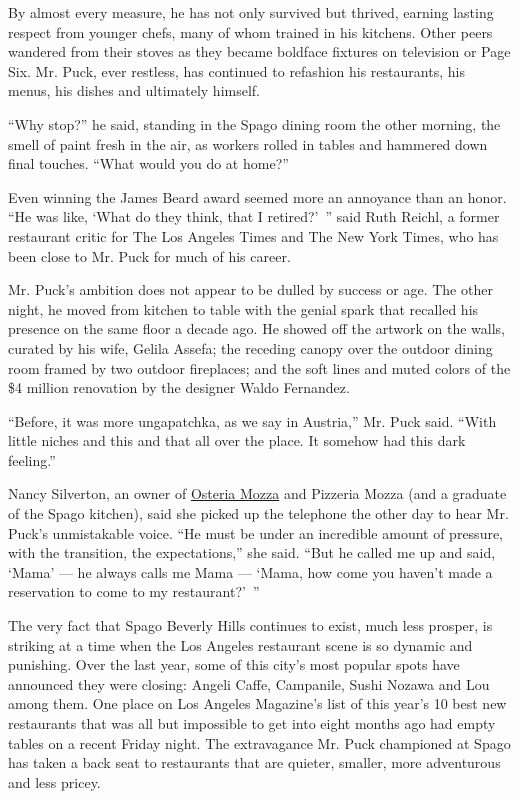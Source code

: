 By almost every measure, he has not only survived but thrived, earning
lasting respect from younger chefs, many of whom trained in his
kitchens. Other peers wandered from their stoves as they became boldface
fixtures on television or Page Six. Mr. Puck, ever restless, has
continued to refashion his restaurants, his menus, his dishes and
ultimately himself.

``Why stop?'' he said, standing in the Spago dining room the other
morning, the smell of paint fresh in the air, as workers rolled in
tables and hammered down final touches. ``What would you do at home?''

Even winning the James Beard award seemed more an annoyance than an
honor. ``He was like, `What do they think, that I retired?'~'' said Ruth
Reichl, a former restaurant critic for The Los Angeles Times and The New
York Times, who has been close to Mr. Puck for much of his career.

Mr. Puck's ambition does not appear to be dulled by success or age. The
other night, he moved from kitchen to table with the genial spark that
recalled his presence on the same floor a decade ago. He showed off the
artwork on the walls, curated by his wife, Gelila Assefa; the receding
canopy over the outdoor dining room framed by two outdoor fireplaces;
and the soft lines and muted colors of the \$4 million renovation by the
designer Waldo Fernandez.

``Before, it was more ungapatchka, as we say in Austria,'' Mr. Puck
said. ``With little niches and this and that all over the place. It
somehow had this dark feeling.''

Nancy Silverton, an owner of
\href{http://www.osteriamozza.com/LA/home.cfm}{Osteria Mozza} and
Pizzeria Mozza (and a graduate of the Spago kitchen), said she picked up
the telephone the other day to hear Mr. Puck's unmistakable voice. ``He
must be under an incredible amount of pressure, with the transition, the
expectations,'' she said. ``But he called me up and said, `Mama' --- he
always calls me Mama --- `Mama, how come you haven't made a reservation
to come to my restaurant?'~''

The very fact that Spago Beverly Hills continues to exist, much less
prosper, is striking at a time when the Los Angeles restaurant scene is
so dynamic and punishing. Over the last year, some of this city's most
popular spots have announced they were closing: Angeli Caffe, Campanile,
Sushi Nozawa and Lou among them. One place on Los Angeles Magazine's
list of this year's 10 best new restaurants that was all but impossible
to get into eight months ago had empty tables on a recent Friday night.
The extravagance Mr. Puck championed at Spago has taken a back seat to
restaurants that are quieter, smaller, more adventurous and less pricey.

